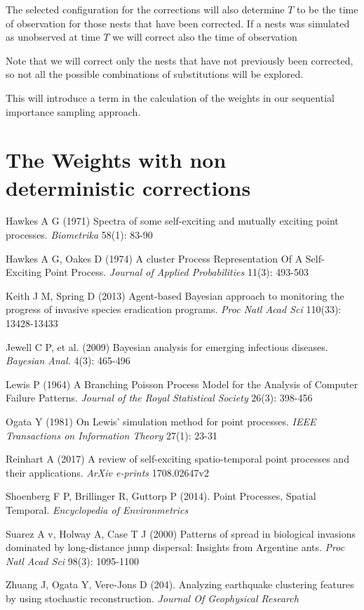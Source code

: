 \documentclass[11pt,a4paper]{article}
\begin{document}
{The selected configuration for the corrections will also determine $T$ to be the time of observation for those nests that have been corrected. If a nests was simulated as unobserved at time $T$ we will correct also the time of observation

Note that we will correct only the nests that have not previously been corrected, so not all the possible combinations of substitutions will be explored.



This will introduce a term in the calculation of the weights in our sequential importance sampling approach.

\section{The Weights with non deterministic corrections}
}

\begin{thebibliography}{99}

 Hawkes A G (1971) Spectra of some self-exciting and mutually exciting point processes. \textit{Biometrika} 58(1): 83-90

 Hawkes A G, Oakes D (1974) A cluster Process Representation Of A Self-Exciting Point Process. \textit{Journal of Applied Probabilities} 11(3): 493-503

 Keith J M, Spring D (2013) Agent-based Bayesian approach to monitoring the progress of invasive species eradication programs. \textit{Proc Natl Acad Sci} 110(33): 13428-13433

 Jewell C P, et al. (2009) Bayesian analysis for emerging infectious diseases. \textit{Bayesian Anal.} 4(3): 465-496

 Lewis P (1964) A Branching Poisson Process Model for the Analysis of Computer Failure Patterns. \textit{Journal of the Royal Statistical Society} 26(3): 398-456

 Ogata Y (1981) On Lewis' simulation method for point processes. \textit{IEEE Transactions on Information Theory} 27(1): 23-31

 Reinhart A (2017) A review of self-exciting spatio-temporal point processes and their applications. \textit{ArXiv e-prints} 1708.02647v2

 Shoenberg F P, Brillinger R, Guttorp P (2014). Point Processes, Spatial Temporal. \textit{Encyclopedia of Environmetrics}

 Suarez A v, Holway A, Case T J (2000) Patterns of spread in biological invasions dominated by long-distance jump dispersal: Insights from Argentine ants. \textit{Proc Natl Acad Sci} 98(3): 1095-1100

 Zhuang J, Ogata Y, Vere-Jons D (204). Analyzing earthquake clustering features by using stochastic reconstruction. \textit{Journal Of Geophysical Research}

\end{thebibliography}
\end{document}
